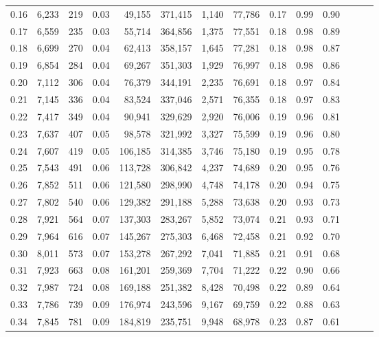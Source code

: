 \begin{tabular}{rrrrrrrrrrrrrr}
0.16 &  6,233 &    219 &  0.03 &   49,155 &  371,415 &   1,140 &  77,786 &  0.17 &  0.99 &      0.90 \\
0.17 &  6,559 &    235 &  0.03 &   55,714 &  364,856 &   1,375 &  77,551 &  0.18 &  0.98 &      0.89 \\
0.18 &  6,699 &    270 &  0.04 &   62,413 &  358,157 &   1,645 &  77,281 &  0.18 &  0.98 &      0.87 \\
0.19 &  6,854 &    284 &  0.04 &   69,267 &  351,303 &   1,929 &  76,997 &  0.18 &  0.98 &      0.86 \\
0.20 &  7,112 &    306 &  0.04 &   76,379 &  344,191 &   2,235 &  76,691 &  0.18 &  0.97 &      0.84 \\
0.21 &  7,145 &    336 &  0.04 &   83,524 &  337,046 &   2,571 &  76,355 &  0.18 &  0.97 &      0.83 \\
0.22 &  7,417 &    349 &  0.04 &   90,941 &  329,629 &   2,920 &  76,006 &  0.19 &  0.96 &      0.81 \\
0.23 &  7,637 &    407 &  0.05 &   98,578 &  321,992 &   3,327 &  75,599 &  0.19 &  0.96 &      0.80 \\
0.24 &  7,607 &    419 &  0.05 &  106,185 &  314,385 &   3,746 &  75,180 &  0.19 &  0.95 &      0.78 \\
0.25 &  7,543 &    491 &  0.06 &  113,728 &  306,842 &   4,237 &  74,689 &  0.20 &  0.95 &      0.76 \\
0.26 &  7,852 &    511 &  0.06 &  121,580 &  298,990 &   4,748 &  74,178 &  0.20 &  0.94 &      0.75 \\
0.27 &  7,802 &    540 &  0.06 &  129,382 &  291,188 &   5,288 &  73,638 &  0.20 &  0.93 &      0.73 \\
0.28 &  7,921 &    564 &  0.07 &  137,303 &  283,267 &   5,852 &  73,074 &  0.21 &  0.93 &      0.71 \\
0.29 &  7,964 &    616 &  0.07 &  145,267 &  275,303 &   6,468 &  72,458 &  0.21 &  0.92 &      0.70 \\
0.30 &  8,011 &    573 &  0.07 &  153,278 &  267,292 &   7,041 &  71,885 &  0.21 &  0.91 &      0.68 \\
0.31 &  7,923 &    663 &  0.08 &  161,201 &  259,369 &   7,704 &  71,222 &  0.22 &  0.90 &      0.66 \\
0.32 &  7,987 &    724 &  0.08 &  169,188 &  251,382 &   8,428 &  70,498 &  0.22 &  0.89 &      0.64 \\
0.33 &  7,786 &    739 &  0.09 &  176,974 &  243,596 &   9,167 &  69,759 &  0.22 &  0.88 &      0.63 \\
0.34 &  7,845 &    781 &  0.09 &  184,819 &  235,751 &   9,948 &  68,978 &  0.23 &  0.87 &      0.61 \\

\end{tabular}
